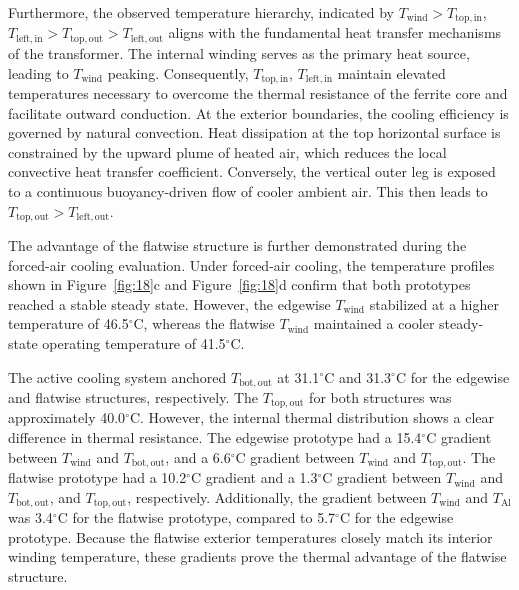 Furthermore, the observed temperature hierarchy, indicated by $T_{\mathrm{wind}} > T_{\mathrm{top, in}}$, $T_{\mathrm{left, in}} > T_{\mathrm{top, out}} > T_{\mathrm{left, out}}$ aligns with the fundamental heat transfer mechanisms of the transformer. The internal winding serves as the primary heat source, leading to $T_{\mathrm{wind}}$ peaking. Consequently, $T_{\mathrm{top, in}}$, $T_{\mathrm{left, in}}$ maintain elevated temperatures necessary to overcome the thermal resistance of the ferrite core and facilitate outward conduction. At the exterior boundaries, the cooling efficiency is governed by natural convection. Heat dissipation at the top horizontal surface is constrained by the upward plume of heated air, which reduces the local convective heat transfer coefficient. Conversely, the vertical outer leg is exposed to a continuous buoyancy-driven flow of cooler ambient air. This then leads to $T_{\mathrm{top, out}} > T_{\mathrm{left, out}}$.

The advantage of the flatwise structure is further demonstrated during the forced-air cooling evaluation. Under forced-air cooling, the temperature profiles shown in Figure~\ref{fig:18}c and Figure~\ref{fig:18}d confirm that both prototypes reached a stable steady state. However, the edgewise $T_{\mathrm{wind}}$ stabilized at a higher temperature of 46.5$^{\circ}$C, whereas the flatwise $T_{\mathrm{wind}}$ maintained a cooler steady-state operating temperature of 41.5$^{\circ}$C. 

The active cooling system anchored $T_{\mathrm{bot, out}}$ at 31.1$^{\circ}$C and 31.3$^{\circ}$C for the edgewise and flatwise structures, respectively. The $T_{\mathrm{top, out}}$ for both structures was approximately 40.0$^{\circ}$C. However, the internal thermal distribution shows a clear difference in thermal resistance. The edgewise prototype had a 15.4$^{\circ}$C gradient between $T_{\mathrm{wind}}$ and $T_{\mathrm{bot, out}}$, and a 6.6$^{\circ}$C gradient between $T_{\mathrm{wind}}$ and $T_{\mathrm{top, out}}$. The flatwise prototype had a 10.2$^{\circ}$C gradient and a 1.3$^{\circ}$C gradient between $T_{\mathrm{wind}}$ and $T_{\mathrm{bot, out}}$, and $T_{\mathrm{top, out}}$, respectively. Additionally, the gradient between $T_{\mathrm{wind}}$ and $T_{\mathrm{Al}}$ was 3.4$^{\circ}$C for the flatwise prototype, compared to 5.7$^{\circ}$C for the edgewise prototype. Because the flatwise exterior temperatures closely match its interior winding temperature, these gradients prove the thermal advantage of the flatwise structure.

